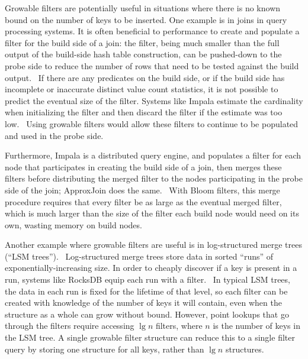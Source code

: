 \documentclass[sigconf]{acmart}
\begin{document}
Growable filters are potentially useful in situations where there is no known bound on the number of keys to be inserted.
One example is in joins in query processing systems.
It is often beneficial to performance to create and populate a filter for the build side of a join:
the filter, being much smaller than the full output of the build-side hash table construction, can be pushed-down to the probe side to reduce the number of rows that need to be tested against the build output.~\cite{tpch-filter}
If there are any predicates on the build side, or if the build side has incomplete or inaccurate distinct value count statistics, it is not possible to predict the eventual size of the filter.
Systems like Impala estimate the cardinality when initializing the filter and then discard the filter if the estimate was too low.~\cite{impala}
Using growable filters would allow these filters to continue to be populated and used in the probe side.

Furthermore, Impala is a distributed query engine, and populates a filter for each node that participates in creating the build side of a join, then merges these filters before distributing the merged filter to the nodes participating in the probe side of the join; ApproxJoin does the same.~\cite{approxjoin, impala}
With Bloom filters, this merge procedure requires that every filter be as large as the eventual merged filter, which is much larger than the size of the filter each build node would need on its own, wasting memory on build nodes.

Another example where growable filters are useful is in log-structured merge trees (``LSM trees'').~\cite{lsm}
Log-structured merge trees store data in sorted ``runs'' of exponentially-increasing size.
In order to cheaply discover if a key is present in a run, systems like RocksDB equip each run with a filter.~\cite{lsm, ribbon}
In typical LSM trees, the data in each run is fixed for the lifetime of that level, so each filter can be created with knowledge of the number of keys it will contain, even when the structure as a whole can grow without bound.
However, point lookups that go through the filters require accessing $\lg n$ filters, where $n$ is the number of keys in the LSM tree.
A single growable filter structure can reduce this to a single filter query by storing one structure for all keys, rather than $\lg n$ structures.

\end{document}
